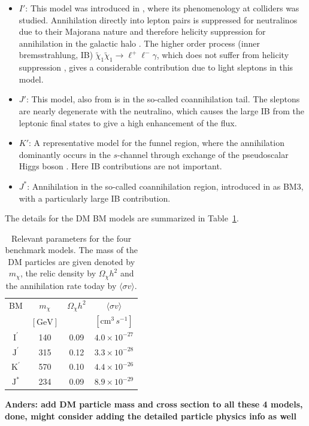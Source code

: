 \documentclass[10pt,aps,pra,reprint,amsmath,amsfonts,amssymb,showpacs,nofootinbib,floatfix]{revtex4-1}
\newcommand{\rmn}{\mathrm}
\newcommand{\Kp}{\rmn{K}^\prime}
\newcommand{\Ip}{\rmn{I}^\prime}
\newcommand{\Js}{\rmn{J}^*}
\newcommand{\Jp}{\rmn{J}^\prime}
\newcommand{\sigmaannv}{\ensuremath{\langle\sigma v\rangle}}
\begin{document}
\begin{itemize}
\item
 $I′$: This model was introduced in \cite{2004EPJC...33..273B}, where
  its phenomenology at colliders was studied. Annihilation directly
  into lepton pairs is suppressed for neutralinos due to their
  Majorana nature and therefore helicity suppression for annihilation
  in the galactic halo \cite{1983PhRvL..50.1419G}. The higher order
  process (inner bremsstrahlung, IB) $\tilde\chi_1\tilde\chi_1\to
  \ell^+\ell^-\gamma$, which does not suffer from helicity suppression
  \cite{1989PhLB..225..372B,2008JHEP...01..049B}, gives a considerable
  contribution due to light sleptons in this model.

\item $J′$: This model, also from \cite{2004EPJC...33..273B} is in the
  so-called coannihilation tail. The sleptons are nearly degenerate
  with the neutralino, which causes the large IB from the leptonic
  final states to give a high enhancement of the flux.

\item $K′$: A representative model for the funnel region, where the
  annihilation dominantly occurs in the $s$-channel through exchange
  of the pseudoscalar Higgs boson \cite{2004EPJC...33..273B}. Here IB
  contributions are not important.

\item $J^*$: Annihilation in the so-called coannihilation region,
  introduced in \cite{2008JHEP...01..049B} as BM3, with a particularly
  large IB contribution.

\end{itemize}

The details for the DM BM models are summarized in Table~\ref{tab:BMpara}.

\begin{table}
\begin{tabular}{cccc}
\hline\hline
      BM &  $m_{\chi}$     & $\Omega_{\chi} h^2$ & $\sigmaannv$\\
         &  $[\rmn{GeV}]$ &                    & $[\rmn{cm}^3\,s^{-1}]$\\
\hline
$\Ip$  & 140 & 0.09 & $4.0\times 10^{-27}$ \\
$\Jp$  & 315 & 0.12 & $3.3\times 10^{-28}$ \\
$\Kp$  & 570 & 0.10 & $4.4\times 10^{-26}$ \\
$\Js$  & 234 & 0.09 & $8.9\times 10^{-29}$ \\
\hline\hline
\end{tabular}
 \caption{Relevant parameters for the four benchmark models. The mass
   of the DM particles are given denoted by $m_{\chi}$, the relic
   density by $\Omega_{\chi} h^2$ and the annihilation rate today by
   $\sigmaannv$.\label{tab:BMpara}}
\end{table}
{\bf Anders: add DM particle mass and cross section to all these 4
  models, done, might consider adding the detailed particle physics
  info as well }
\end{document}

